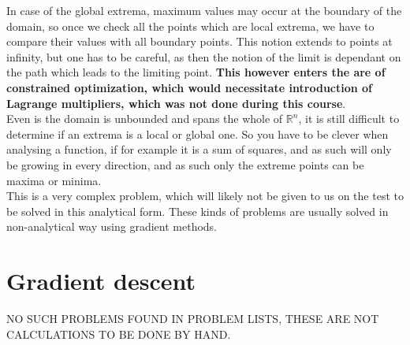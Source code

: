 In case of the global extrema, maximum values may occur at the boundary of the domain, so once we check all the points which are local extrema, we have to compare their values with all boundary points. This notion extends to points at infinity, but one has to be careful, as then the notion of the limit is dependant on the path which leads to the limiting point.
\textbf{This however enters the are of constrained optimization, which would necessitate introduction of Lagrange multipliers, which was not done during this course}.
\\
Even is the domain is unbounded and spans the whole of $\mathbb{R}^{n}$, it is still difficult to determine if an extrema is a local or global one. So you have to be clever when analysing a function, if for example it is a sum of squares, and as such will only be growing in every direction, and as such only the extreme points can be maxima or minima. \\
This is a very complex problem, which will likely not be given to us on the test to be solved in this analytical form. These kinds of problems are usually solved in non-analytical way using gradient methods.


\section{Gradient descent}


NO SUCH PROBLEMS FOUND IN PROBLEM LISTS, THESE ARE NOT CALCULATIONS TO BE DONE
BY HAND.
